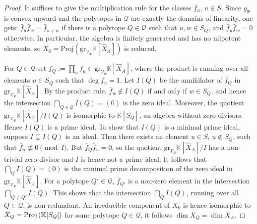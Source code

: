 \documentclass[12pt, a4article]{amsart}   	%
\numberwithin{equation}{section}
\theoremstyle{plain}
\theoremstyle{definition}
\begin{document}
\begin{proof}
It suffices to give the multiplication rule for the classes $\bar f_u$, $u\in S$. Since $g_\Psi$ is convex upward and the polytopes in $\mathcal Q$ are exactly the domains of linearity, one gets: $\bar f_{u}\bar f_{w}= \bar f_{u+w}$ if there is a polytope $ Q\in \mathcal Q$ such that $u,w\in S_Q$, and $\bar f_{u}\bar f_{w}=0$ otherwise. In particular, the algebra is finitely generated and has no nilpotent elements, so $X_0 = \textrm{Proj}(\mathrm{gr}_{\mathcal V_\Psi} \mathbb K[\hat X_A])$ is reduced. 

For $Q\in\mathcal Q$ set  $\bar f_Q :=\prod_{u} \bar f_u\in  \mathrm{gr}_{\mathcal V_\Psi} \mathbb K[\hat X_A]$, where the product is running over all elements $u\in S_Q$ such that $\deg f_u=1$. 
Let $I(Q)$ be the annihilator of $\bar f_Q$ in $\mathrm{gr}_{\mathcal V_\Psi} \mathbb K[\hat X_A]$. By the product rule, $\bar f_w \not\in I(Q)$ if and only if $w\in S_Q$, and hence the intersection $\bigcap_{Q\in\mathcal Q} I(Q)= (0)$ is the zero ideal. Moreover, the quotient $\mathrm{gr}_{\mathcal V_\Psi} \mathbb K[\hat X_A]/I(Q)$  is isomorphic to $\mathbb K[S_Q]$, an algebra without zero-divisors. Hence $I(Q)$ is a prime ideal. To show that $I(Q)$ is a minimal prime ideal, suppose $I\subsetneq I(Q)$ is an ideal. Then there exists an element $u\in  S$, $u\not\in S_Q$, such that $\bar f_u\not\equiv 0\pmod I$. But $\bar f_Q \bar f_u = 0$, so the quotient $\mathrm{gr}_{\mathcal V_\Psi} \mathbb K[\hat X_A]/I$ has a non-trivial zero divisor and $I$ is hence not a prime ideal. It follows that $\bigcap_Q I(Q)= (0)$ is the minimal prime decomposition of the zero ideal in $\mathrm{gr}_{\mathcal V_\Psi} \mathbb K[\hat X_A]$. For a polytope $Q'\in \mathcal Q$, $\bar f_{Q'}$ is a non-zero element in the intersection $\bigcap_{Q\not=Q'} I(Q)$. This shows that the intersection $\bigcap_Q I(Q)$, running over all $Q \in\mathcal  Q$, is non-redundant. An irreducible component of $X_0$ is hence isomorphic to $X_Q = \textrm{Proj\,} (\mathbb K[S_Q])$ for some polytope $Q\in\mathcal Q$, it follows $\dim X_Q = \dim X_A$.
\end{proof}
\end{document}
